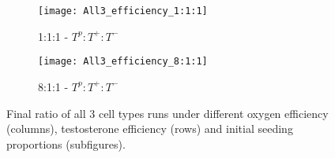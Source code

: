 \begin{figure}[h!]
  \centering
  \begin{subfigure}[b]{\textwidth}
    \centering
    \texttt{[image: All3\_efficiency\_1:1:1]}
    \caption{1:1:1 - $T^p:T^+:T^-$}
    \label{fig_all3_1:1:1}
  \end{subfigure}
  \begin{subfigure}[b]{\textwidth}
    \centering
    \texttt{[image: All3\_efficiency\_8:1:1]}
    \caption{8:1:1 - $T^p:T^+:T^-$}
    \label{fig_all3_8:1:1}
  \end{subfigure}
  \caption[Final ratio of all 3 cell types runs under different efficiencies]{Final ratio of all 3 cell types runs under different oxygen efficiency (columns), testosterone efficiency (rows) and initial seeding proportions (subfigures).}
  \label{fig_all3}
\end{figure}
